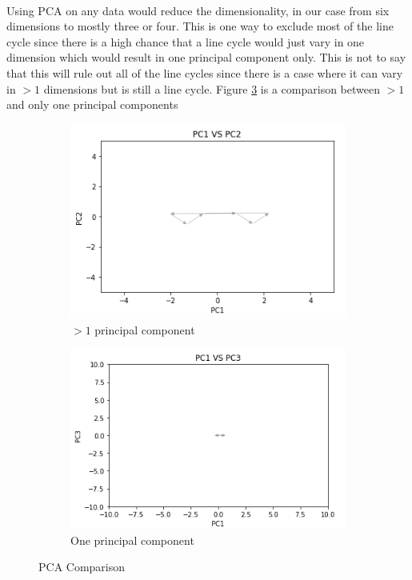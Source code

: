 \documentclass[a4paper]{article}
\begin{document}
\\\newline
Using PCA on any data would reduce the dimensionality, in our case from six dimensions to mostly three or four. This is one way to exclude most of the line cycle since there is a high chance that a line cycle would just vary in one dimension which would result in one principal component only. This is not to say that this will rule out all of the line cycles since there is a case where it can vary in $>1$ dimensions but is still a line cycle. Figure \ref{pcacomparison} is a comparison between $>1$ and only one principal components
\begin{figure}[ht!]
	\centering
	\begin{subfigure}{.5\textwidth}
		\centering
		\includegraphics[width=.8\linewidth]{pcabiggerthan1.png}
		\caption{$>1$ principal component}
		\label{pcabiggerthan1}
	\end{subfigure}%
	\begin{subfigure}{.5\textwidth}
		\centering
		\includegraphics[width=.8\linewidth]{pca1.png}
		\caption{One principal component}
		\label{pca1}
	\end{subfigure}
	\caption{PCA Comparison}
	\label{pcacomparison}
\end{figure}
\end{document}
